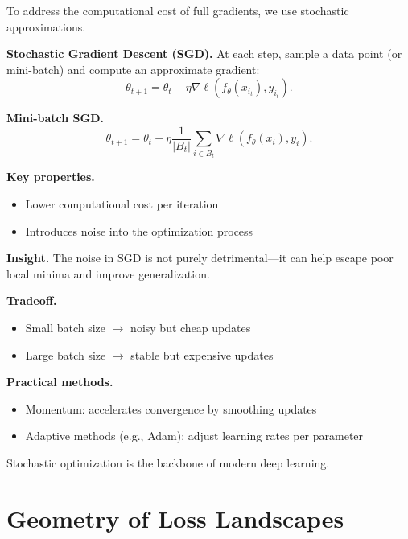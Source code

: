 To address the computational cost of full gradients, we use stochastic approximations.

\medskip

\noindent
\textbf{Stochastic Gradient Descent (SGD).}  
At each step, sample a data point (or mini-batch) and compute an approximate gradient:
\[
\theta_{t+1} = \theta_t - \eta \nabla \ell(f_\theta(x_{i_t}), y_{i_t}).
\]

\medskip

\noindent
\textbf{Mini-batch SGD.}
\[
\theta_{t+1} = \theta_t - \eta \frac{1}{|B_t|} \sum_{i \in B_t} \nabla \ell(f_\theta(x_i), y_i).
\]

\medskip

\noindent
\textbf{Key properties.}
\begin{itemize}
    \item Lower computational cost per iteration
    \item Introduces noise into the optimization process
\end{itemize}

\medskip

\noindent
\textbf{Insight.}  
The noise in SGD is not purely detrimental—it can help escape poor local minima and improve generalization.

\medskip

\noindent
\textbf{Tradeoff.}
\begin{itemize}
    \item Small batch size $\rightarrow$ noisy but cheap updates
    \item Large batch size $\rightarrow$ stable but expensive updates
\end{itemize}

\medskip

\noindent
\textbf{Practical methods.}
\begin{itemize}
    \item Momentum: accelerates convergence by smoothing updates
    \item Adaptive methods (e.g., Adam): adjust learning rates per parameter
\end{itemize}

\medskip

Stochastic optimization is the backbone of modern deep learning.

\section{Geometry of Loss Landscapes}

